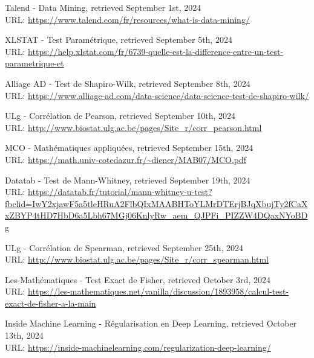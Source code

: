 \adjustmtc
\newpage
\renewcommand\bibname{Webographie}
\begin{thebibliography}{9}
\thispagestyle{MyStyle}

Talend - Data Mining, retrieved September 1st, 2024 \\ 
URL: \url{https://www.talend.com/fr/resources/what-is-data-mining/}

XLSTAT - Test Paramétrique, retrieved September 5th, 2024 \\ 
URL: \url{https://help.xlstat.com/fr/6739-quelle-est-la-difference-entre-un-test-parametrique-et}

Alliage AD - Test de Shapiro-Wilk, retrieved September 8th, 2024 \\ 
URL: \url{https://www.alliage-ad.com/data-science/data-science-test-de-shapiro-wilk/}

ULg - Corrélation de Pearson, retrieved September 10th, 2024 \\ 
URL: \url{http://www.biostat.ulg.ac.be/pages/Site_r/corr_pearson.html}

MCO - Mathématiques appliquées, retrieved September 15th, 2024 \\ 
URL: \url{https://math.univ-cotedazur.fr/~diener/MAB07/MCO.pdf}

Datatab - Test de Mann-Whitney, retrieved September 19th, 2024 \\ 
URL: \url{https://datatab.fr/tutorial/mann-whitney-u-test?fbclid=IwY2xjawF5a5tleHRuA2FlbQIxMAABHToYLMrDTErjBJqXbujTy2fCaXxZBYP4tHD7HbD6a5Lbh67MGj06KnlyRw_aem_QJPFi_PIZZW4DQaxNYoBDg}

ULg - Corrélation de Spearman, retrieved September 25th, 2024 \\ 
URL: \url{http://www.biostat.ulg.ac.be/pages/Site_r/corr_spearman.html}

Les-Mathématiques - Test Exact de Fisher, retrieved October 3rd, 2024 \\ 
URL: \url{https://les-mathematiques.net/vanilla/discussion/1893958/calcul-test-exact-de-fisher-a-la-main}

Inside Machine Learning - Régularisation en Deep Learning, retrieved October 13th, 2024 \\ 
URL: \url{https://inside-machinelearning.com/regularization-deep-learning/}


\end{thebibliography} 

